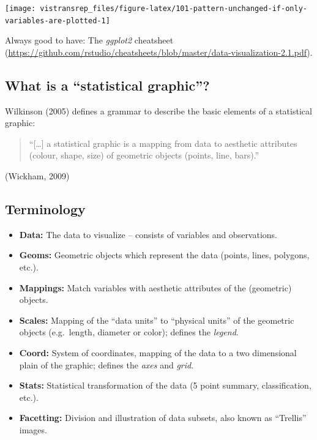 \documentclass[]{book}
\begin{document}
\begin{flushright}\texttt{[image: vistransrep\_files/figure-latex/101-pattern-unchanged-if-only-variables-are-plotted-1]} \end{flushright}

Always good to have: The \emph{ggplot2} cheatsheet (\url{https://github.com/rstudio/cheatsheets/blob/master/data-visualization-2.1.pdf}).

\hypertarget{what-is-a-statistical-graphic}{%
\subsection{What is a ``statistical graphic''?}\label{what-is-a-statistical-graphic}}

Wilkinson (2005) defines a grammar to describe the basic elements of a
statistical graphic:

\begin{quote}
``{[}\ldots{}{]} a statistical graphic is a mapping from data to
aesthetic attributes (colour, shape, size) of geometric objects
(points, line, bars).''
\end{quote}

\hfill (Wickham, 2009)

\hypertarget{terminology}{%
\subsection{Terminology}\label{terminology}}

\begin{itemize}
\item
  \textbf{Data:} The data to visualize -- consists of variables and observations.
\item
  \textbf{Geoms:} Geometric objects which represent the data (points, lines, polygons, etc.).
\item
  \textbf{Mappings:} Match variables with aesthetic attributes of the (geometric) objects.
\item
  \textbf{Scales:} Mapping of the ``data units'' to ``physical units'' of the geometric objects (e.g.~length, diameter or color); defines the \emph{legend}.
\item
  \textbf{Coord:} System of coordinates, mapping of the data to a two dimensional plain of the graphic; defines the \emph{axes} and \emph{grid}.
\item
  \textbf{Stats:} Statistical transformation of the data (5 point summary, classification, etc.).
\item
  \textbf{Facetting:} Division and illustration of data subsets, also known as ``Trellis'' images.
\end{itemize}
\end{document}
